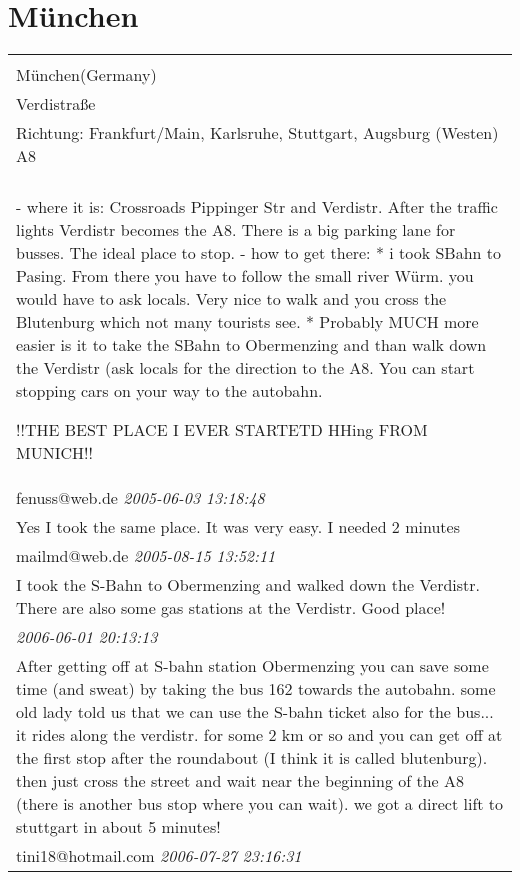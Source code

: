 \documentclass[a4paper,12pt]{article}
\begin{document}
\section{München}
\begin{tabular}{|p{13cm}|}
\hline\\
München(Germany)\\
Verdistraße\\
Richtung: Frankfurt/Main, Karlsruhe, Stuttgart, Augsburg (Westen) A8 \\
\hline\\
- where it is: Crossroads Pippinger Str and Verdistr. After the traffic lights Verdistr becomes the A8. There is a big parking lane for busses. The ideal place to stop.
- how to get there:
* i took SBahn to Pasing. From there you have to follow the small river Würm. you would have to ask locals. Very nice to walk and you cross the Blutenburg which not many tourists see.
* Probably MUCH more easier is it to take the SBahn to Obermenzing and than walk down the Verdistr (ask locals for the direction to the A8. You can start stopping cars on your way to the autobahn.

!!THE BEST PLACE I EVER STARTETD HHing FROM MUNICH!! \\
fenuss@web.de \textit{ 2005-06-03 13:18:48 }\\\hline Yes I took the same place. It was very easy. I needed 2 minutes \\
mailmd@web.de \textit{ 2005-08-15 13:52:11 }\\\hline I took the S-Bahn to Obermenzing and walked down the Verdistr.
There are also some gas stations at the Verdistr.
Good place! \\
\textit{ 2006-06-01 20:13:13 }\\\hline After getting off at S-bahn station Obermenzing you can save some time (and sweat) by taking the bus 162 towards the autobahn. some old lady told us that we can use the S-bahn ticket also for the bus... it rides along the verdistr. for some 2 km or so and you can get off at the first stop after the roundabout (I think it is called blutenburg). then just cross the street and wait near the beginning of the A8 (there is another bus stop where you can wait). we got a direct lift to stuttgart in about 5 minutes! \\
tini18@hotmail.com \textit{ 2006-07-27 23:16:31 }\\\hline
\end{tabular}
\end{document}
